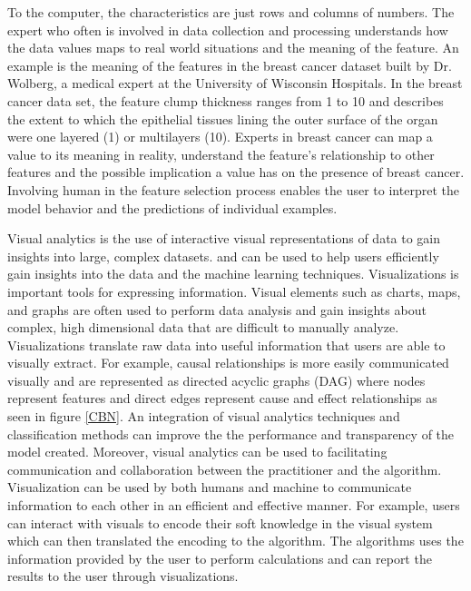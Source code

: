 To the computer, the characteristics are just rows and columns of numbers. The expert who often is involved in data collection and processing understands how the data values maps to real world situations and the meaning of the feature. An example is the meaning of the features in the breast cancer dataset built by Dr. Wolberg, a medical expert at the University of Wisconsin Hospitals. In the breast cancer data set, the feature clump thickness ranges from 1 to 10 and describes the extent to which the epithelial tissues lining the outer surface of the organ were one layered (1) or multilayers (10). Experts in breast cancer can map a value to its meaning in reality, understand the feature's relationship to other features and the possible implication a value has on the presence of breast cancer. Involving human in the feature selection process enables the user to interpret the model behavior and the predictions of individual examples.

Visual analytics is the use of interactive visual representations of data to gain insights into large, complex datasets. and can be used to help users efficiently gain insights into the data and the machine learning techniques. Visualizations is important tools for expressing information. Visual elements such as charts, maps, and graphs are often used to perform data analysis and gain insights about complex, high dimensional data that are difficult to manually analyze. Visualizations translate raw data into useful information that users are able to visually extract. For example, causal relationships is more easily communicated visually and are represented as directed acyclic graphs (DAG) where nodes represent features and direct edges represent cause and effect relationships as seen in figure \ref{CBN}. An integration of visual analytics techniques and classification methods can improve the the performance and transparency of the model created. Moreover, visual analytics can be used to facilitating communication and collaboration between the practitioner and the algorithm. Visualization can be used by both humans and machine to communicate information to each other in an efficient and effective manner. For example, users can interact with visuals to encode their soft knowledge in the visual system which can then translated the encoding to the algorithm. The algorithms uses the information provided by the user to perform calculations and can report the results to the user through visualizations.

